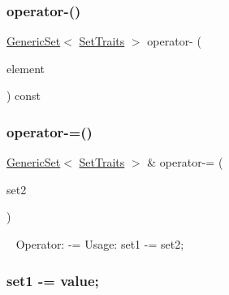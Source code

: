\subsubsection{\texorpdfstring{operator-\/()}{operator-()}\hspace{0.1cm}{\footnotesize\ttfamily [2/2]}}
{\footnotesize\ttfamily \mbox{\hyperlink{classstanfordcpplib_1_1collections_1_1GenericSet}{Generic\+Set}}$<$ \mbox{\hyperlink{structstanfordcpplib_1_1collections_1_1SetTraits}{Set\+Traits}} $>$ operator-\/ (\begin{DoxyParamCaption}\item[{const \mbox{\hyperlink{classstanfordcpplib_1_1collections_1_1GenericSet_a669c81f158766925e7293f97c0099b28}{value\+\_\+type}} \&}]{element }\end{DoxyParamCaption}) const}

\mbox{\label{classstanfordcpplib_1_1collections_1_1GenericSet_adffcff306f0a21b87fc0eb99343a2719}} 
\subsubsection{\texorpdfstring{operator-\/=()}{operator-=()}\hspace{0.1cm}{\footnotesize\ttfamily [1/2]}}
{\footnotesize\ttfamily \mbox{\hyperlink{classstanfordcpplib_1_1collections_1_1GenericSet}{Generic\+Set}}$<$ \mbox{\hyperlink{structstanfordcpplib_1_1collections_1_1SetTraits}{Set\+Traits}} $>$ \& operator-\/= (\begin{DoxyParamCaption}\item[{const \mbox{\hyperlink{classstanfordcpplib_1_1collections_1_1GenericSet}{Generic\+Set}}$<$ \mbox{\hyperlink{structstanfordcpplib_1_1collections_1_1SetTraits}{Set\+Traits}} $>$ \&}]{set2 }\end{DoxyParamCaption})}



~\newline
 Operator\+: -\/= Usage\+: set1 -\/= set2; \subsubsection*{set1 -\/= value; }

